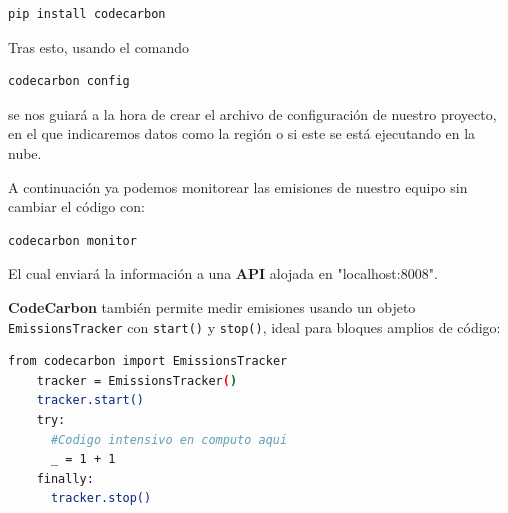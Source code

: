 \documentclass[12pt,a4paper]{report}
\begin{document}
\begin{tcolorbox}[colback=codebackground, colframe=codeborder, boxrule=0.8pt, arc=0mm, boxsep=5pt, left=5pt, right=5pt, top=5pt, bottom=5pt]
  \begin{lstlisting}[language=bash]
    pip install codecarbon
  \end{lstlisting}
\end{tcolorbox}

Tras esto, usando el comando

\begin{tcolorbox}[colback=codebackground, colframe=codeborder, boxrule=0.8pt, arc=0mm, boxsep=5pt, left=5pt, right=5pt, top=5pt, bottom=5pt]
  \begin{lstlisting}[language=bash]
    codecarbon config
  \end{lstlisting}
\end{tcolorbox}

se nos guiará a la hora de crear el archivo de configuración de nuestro
proyecto, en el que indicaremos datos como la región o si este se está
ejecutando en la nube.

A continuación ya podemos monitorear las emisiones de nuestro equipo sin
cambiar el código con:

\begin{tcolorbox}[colback=codebackground, colframe=codeborder, boxrule=0.8pt, arc=0mm, boxsep=5pt, left=5pt, right=5pt, top=5pt, bottom=5pt]
  \begin{lstlisting}[language=bash]
    codecarbon monitor
  \end{lstlisting}
\end{tcolorbox}

El cual enviará la información a una \textbf{API} alojada en
"localhost:8008".

\textbf{CodeCarbon} también permite medir emisiones usando un objeto \texttt{EmissionsTracker} con \texttt{start()} y \texttt{stop()}, ideal para bloques amplios de código:

\begin{tcolorbox}[colback=codebackground, colframe=codeborder, boxrule=0.8pt, arc=0mm, boxsep=5pt, left=5pt, right=5pt, top=5pt, bottom=5pt]
  \begin{lstlisting}[language=bash]
    from codecarbon import EmissionsTracker
    tracker = EmissionsTracker()
    tracker.start()
    try:
      #Codigo intensivo en computo aqui
      _ = 1 + 1
    finally:
      tracker.stop()
  \end{lstlisting}
\end{tcolorbox}
\end{document}
